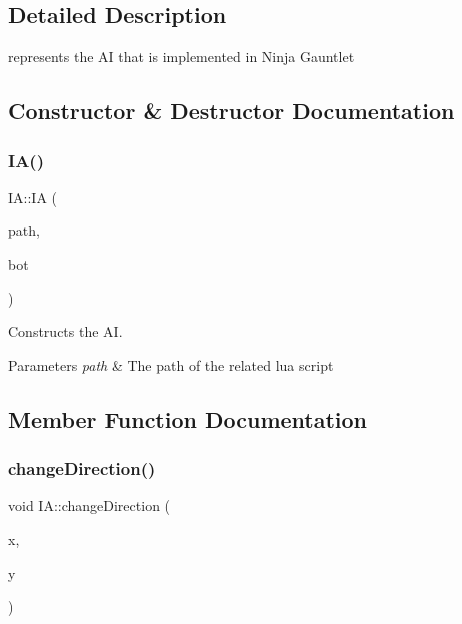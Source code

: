 \subsection{Detailed Description}
represents the AI that is implemented in Ninja Gauntlet 

\subsection{Constructor \& Destructor Documentation}
\mbox{\label{classIA_a0733aa0c9dd00b142f8b474fc3b0b714}} 
\subsubsection{\texorpdfstring{I\+A()}{IA()}}
{\footnotesize\ttfamily I\+A\+::\+IA (\begin{DoxyParamCaption}\item[{std\+::string const}]{path,  }\item[{A\+Character $\ast$}]{bot }\end{DoxyParamCaption})}



Constructs the AI. 


\begin{DoxyParams}{Parameters}
{\em path} & The path of the related lua script \\
\hline
\end{DoxyParams}


\subsection{Member Function Documentation}
\mbox{\label{classIA_ac2e4429cbb6cfba8c5f1b99d04275ce5}} 
\subsubsection{\texorpdfstring{change\+Direction()}{changeDirection()}}
{\footnotesize\ttfamily void I\+A\+::change\+Direction (\begin{DoxyParamCaption}\item[{int}]{x,  }\item[{int}]{y }\end{DoxyParamCaption})}



